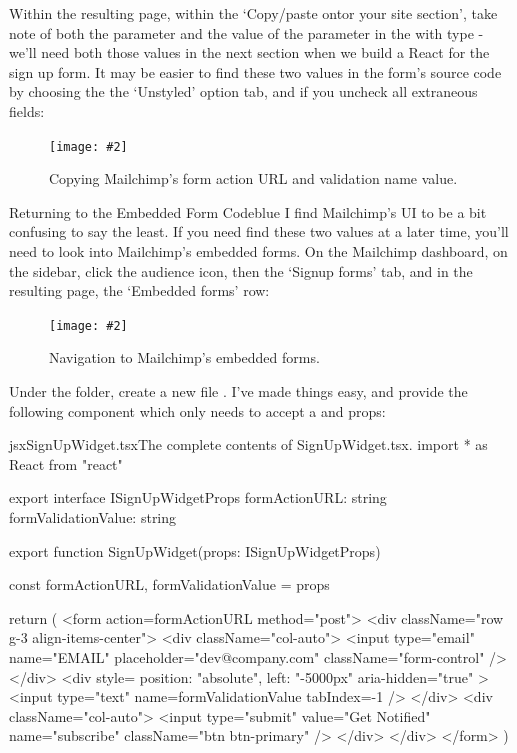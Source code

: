 \documentclass[paper=6in:9in,pagesize=pdftex,headinclude=on,footinclude=on,12pt,twoside]{scrbook}
\newcommand{\standardfigure}[3]{\begin{figure}[H]\begin{center}\texttt{[image: \#2]}\caption{#3}\label{fig:#2}\end{center}\end{figure}}
\begin{document}
Within the resulting page, within the `Copy/paste ontor your site section', take note of both the  parameter and the value of the  parameter in the  with type  - we'll need both those values in the next section when we build a React for the sign up form. It may be easier to find these two values in the form's source code by choosing the the `Unstyled' option tab, and if you uncheck all extraneous fields:

\standardfigure{\textwidth}{frontend/mailchimp/finding-form-field-values}{Copying Mailchimp's form action URL and validation name value.}

\begin{highlightBox}{Returning to the Embedded Form Code}{blue}{\information}
I find Mailchimp's UI to be a bit confusing to say the least. If you need find these two values at a later time, you'll need to look into Mailchimp's embedded forms. On the Mailchimp dashboard, on the sidebar, click the audience icon, then the `Signup forms' tab, and in the resulting page, the `Embedded forms' row:

\standardfigure{\textwidth}{frontend/mailchimp/navigation-to-embedded-forms}{Navigation to Mailchimp's embedded forms.}

\end{highlightBox}


Under the  folder, create a new file . 
I've made things easy, and provide the following component which only needs to accept a  and  props:

\begin{codeInput}{jsx}{SignUpWidget.tsx}{The complete contents of SignUpWidget.tsx.}
import * as React from "react"

export interface ISignUpWidgetProps {
  formActionURL: string
  formValidationValue: string
}

export function SignUpWidget(props: ISignUpWidgetProps) {
  const { formActionURL, formValidationValue } = props

  return (
    <form action={formActionURL} method="post">
      <div className="row g-3 align-items-center">
        <div className="col-auto">
          <input
            type="email"
            name="EMAIL"
            placeholder="dev@company.com"
            className="form-control"
          />
        </div>
        <div
          style={{ position: "absolute", left: "-5000px" }}
          aria-hidden="true"
        >
          <input type="text" name={formValidationValue} tabIndex={-1} />
        </div>
        <div className="col-auto">
          <input
            type="submit"
            value="Get Notified"
            name="subscribe"
            className="btn btn-primary"
          />
        </div>
      </div>
    </form>
  )
}  
\end{codeInput}
\end{document}
